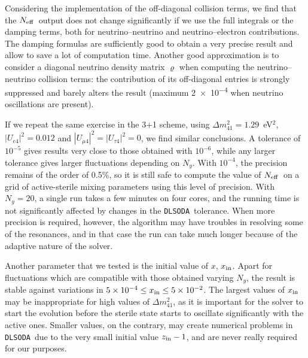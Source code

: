 \documentclass[notitlepage,nofootinbib,showpacs,preprintnumbers,amsmath,amssymb,superscriptaddress,prd,onecolumn]{revtex4-1}
\newcommand{\Neff}{\ensuremath{N_{\rm eff}}}
\newcommand{\dmsq}[1]{\ensuremath{\Delta m^2_{#1}}}
\newcommand{\uasq}[1]{\ensuremath{|U_{#1 4}|^2}}
\newcommand{\e}[1]{\ensuremath{\times10^{#1}}}
\newcommand{\dlsoda}{\texttt{DLSODA}}
\begin{document}
Considering the implementation of the off-diagonal collision terms,
we find that the \Neff\ output does not change significantly if we use the full integrals or the damping terms,
both for neutrino--neutrino and neutrino--electron contributions.
The damping formulas are sufficiently good to obtain a very precise result and allow to save
a lot of computation time.
Another good approximation is to consider a diagonal neutrino density matrix $\varrho$
when computing the neutrino--neutrino collision terms:
the contribution of its off-diagonal entries is strongly suppressed and barely alters the result
(maximum \num{2e-4} when neutrino oscillations are present).

If we repeat the same exercise in the 3+1 scheme,
using $\dmsq{41}=1.29$~eV$^2$,
$\uasq{e}=0.012$ \cite{Gariazzo:2018mwd} and $\uasq{\mu}=\uasq{\tau}=0$,
we find similar conclusions.
A tolerance of $10^{-5}$ gives results very close to those obtained with $10^{-6}$,
while any larger tolerance gives larger fluctuations depending on $N_y$.
With $10^{-4}$, the precision remains of the order of 0.5\%, so it is still safe to compute the value of \Neff\ on a grid of active-sterile mixing parameters
using this level of precision.
With $N_y=20$, a single run takes a few minutes on four cores, and the running time is not significantly affected
by changes in the \dlsoda\ tolerance.
When more precision is required, however, the algorithm may have troubles in resolving some of the resonances,
and in that case the run can take much longer because of the adaptive nature of the solver.

Another parameter that we tested is the initial value of $x$, $x_{\rm in}$.
Apart for fluctuations which are compatible with those obtained varying $N_y$,
the result is stable against variations in $5\e{-4}\leq x_{\rm in}\leq5\e{-2}$.
The largest values of $x_{\rm in}$ may be inappropriate for high values of \dmsq{41},
as it is important for the solver to start the evolution before the sterile state
starts to oscillate significantly with the active ones.
Smaller values, on the contrary, may create numerical problems in \dlsoda\
due to the very small initial value $z_{\rm in}-1$,
and are never really required for our purposes.
\end{document}

